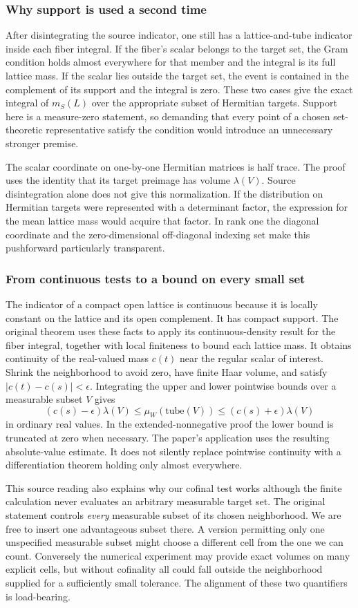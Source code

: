 \documentclass[12pt,letterpaper]{article}
\newcommand{\code}[1]{\texttt{\detokenize{#1}}}
\begin{document}
\subsubsection{Why support is used a second time}
After disintegrating the source indicator, one still has a lattice-and-tube indicator inside each fiber integral. If the fiber's scalar belongs to the target set, the Gram condition holds almost everywhere for that member and the integral is its full lattice mass. If the scalar lies outside the target set, the event is contained in the complement of its support and the integral is zero. These two cases give the exact integral of $m_S(L)$ over the appropriate subset of Hermitian targets. Support here is a measure-zero statement, so demanding that every point of a chosen set-theoretic representative satisfy the condition would introduce an unnecessary stronger premise.
\par
The scalar coordinate on one-by-one Hermitian matrices is half trace. The proof uses the identity that its target preimage has \code{coordHerm} volume $\lambda(V)$. Source disintegration alone does not give this normalization. If the distribution on Hermitian targets were represented with a determinant factor, the expression for the mean lattice mass would acquire that factor. In rank one the diagonal coordinate and the zero-dimensional off-diagonal indexing set make this pushforward particularly transparent.
\subsubsection{From continuous tests to a bound on every small set}
The indicator of a compact open lattice is continuous because it is locally constant on the lattice and its open complement. It has compact support. The original theorem uses these facts to apply its continuous-density result for the fiber integral, together with local finiteness to bound each lattice mass. It obtains continuity of the real-valued mass $c(t)$ near the regular scalar of interest. Shrink the neighborhood to avoid zero, have finite Haar volume, and satisfy $|c(t)-c(s)|<\epsilon$. Integrating the upper and lower pointwise bounds over a measurable subset $V$ gives
\[
 (c(s)-\epsilon)\lambda(V)\leq \mu_W(\mathrm{tube}(V))
              \leq(c(s)+\epsilon)\lambda(V)
\]
in ordinary real values. In the extended-nonnegative proof the lower bound is truncated at zero when necessary. The paper's application uses the resulting absolute-value estimate. It does not silently replace pointwise continuity with a differentiation theorem holding only almost everywhere.
\par
This source reading also explains why our cofinal test works although the finite calculation never evaluates an arbitrary measurable target set. The original statement controls \emph{every} measurable subset of its chosen neighborhood. We are free to insert one advantageous subset there. A version permitting only one unspecified measurable subset might choose a different cell from the one we can count. Conversely the numerical experiment may provide exact volumes on many explicit cells, but without cofinality all could fall outside the neighborhood supplied for a sufficiently small tolerance. The alignment of these two quantifiers is load-bearing.
\end{document}
